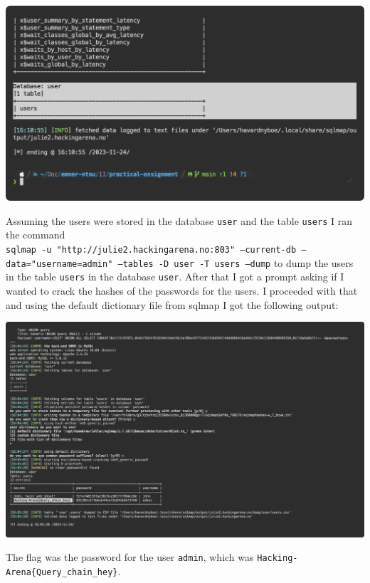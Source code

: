 \begin{center}
    \includegraphics[width=15cm]{img/Web hacking/Tricky login/Screenshot 2023-11-24 at 16.11.07.png}
\end{center}

Assuming the users were stored in the database \texttt{user} and the table \texttt{users} I ran the command
\\\texttt{sqlmap -u "http://julie2.hackingarena.no:803" --current-db  --data="username=admin" --tables -D user -T users --dump}
to dump the users in the table \texttt{users} in the database \texttt{user}.
After that I got a prompt asking if I wanted to crack the hashes of the passwords for the users. I proceeded with that and using the default dictionary file from sqlmap I got the following output:

\begin{center}
    \includegraphics[width=15cm]{img/Web hacking/Tricky login/Screenshot 2023-11-24 at 16.09.41.png}
\end{center}

The flag was the password for the user \texttt{admin}, which was \texttt{Hacking-Arena\{Query\_chain\_hey\}}.

